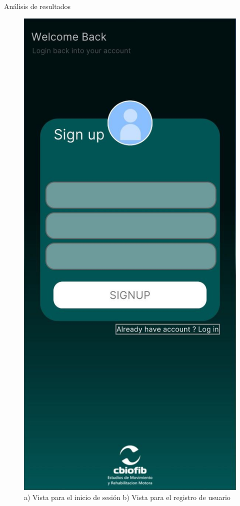 \begin{thesischapter}{3} {Análisis de resultados}
\begin{figure}[ht]
        \includegraphics[scale=0.17]{images/ui/1.jpg}
        \caption{a) Vista para el inicio de sesión b) Vista para el registro de usuario}
        \label{fig: ui0}
    \end{figure}


\end{thesischapter}
